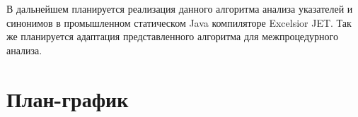 \documentclass[14pt,titlepage]{extarticle}
\let\oldsection\section
\renewcommand{\section}{\newpage\oldsection}
\begin{document}
    В дальнейшем планируется реализация данного алгоритма анализа указателей и
    синонимов в промышленном статическом Java компиляторе Excelsior JET.
    Так же планируется адаптация представленного алгоритма для межпроцедурного
    анализа.

  \newpage
    

  \newpage
  \thispagestyle{empty}
  \pagestyle{empty}
  \section*{План-график}
\end{document}

